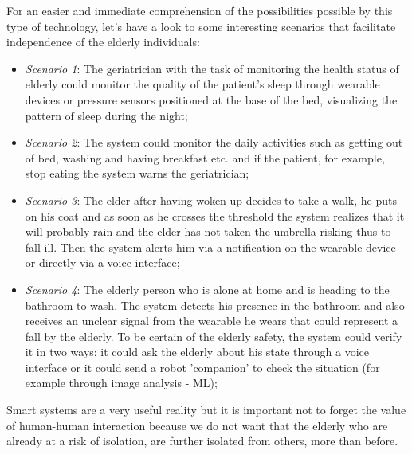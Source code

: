 \documentclass{thesisreport}
\begin{document}
 For an easier and immediate comprehension of the possibilities possible by this type of technology, let's have a look to some interesting scenarios that facilitate independence of the elderly individuals:
 \begin{itemize}
     \item \textit{Scenario 1}: The geriatrician with the task of monitoring the health status of elderly could monitor the quality of the patient's sleep through wearable devices or pressure sensors positioned at the base of the bed, visualizing the pattern of sleep during the night;
     \item \textit{Scenario 2}: The system could monitor the daily activities such as getting out of bed, washing and having breakfast etc. and if the patient, for example, stop eating the system warns the geriatrician;
     \item \textit{Scenario 3}: The elder after having woken up decides to take a walk, he puts on his coat and as soon as he crosses the threshold the system realizes that it will  probably rain and the elder has not taken the umbrella risking thus to fall ill. Then the system alerts him via a notification on the wearable device or directly via a voice interface;
     \item \textit{Scenario 4}: The elderly person who is alone at home  and is heading to the bathroom to wash. The system detects his presence in the bathroom and also receives an unclear signal from the wearable he wears that could represent a fall by the elderly. To be certain of the elderly safety, the system could verify it  in two ways: it could ask the elderly about his state through a voice interface or it could send a robot 'companion' to check the situation (for example through image analysis - ML);
 \end{itemize}
 
 Smart systems are a very useful reality but it is important not to forget the value of human-human interaction because we do not want that the elderly who are already at a risk of isolation, are further isolated from others, more than before.
 
\end{document}
